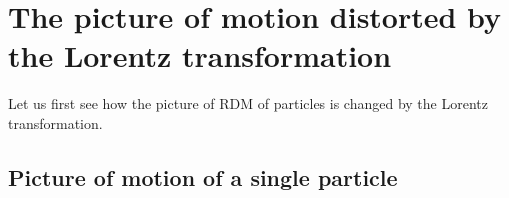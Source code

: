 


\section{The picture of motion distorted by the Lorentz transformation}

Let us first see how the picture of RDM of particles is changed by the Lorentz transformation.

\subsection{Picture of motion of a single particle}

